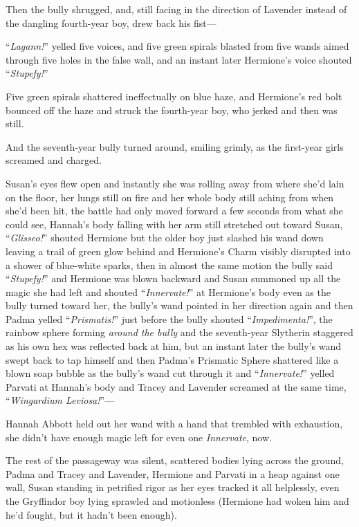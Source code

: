 Then the bully shrugged, and, still facing in the direction of Lavender instead of the dangling fourth-year boy, drew back his fist—

“\emph{Lagann!}” yelled five voices, and five green spirals blasted from five wands aimed through five holes in the false wall, and an instant later Hermione’s voice shouted “\emph{Stupefy!}”

Five green spirals shattered ineffectually on blue haze, and Hermione’s red bolt bounced off the haze and struck the fourth-year boy, who jerked and then was still.

And the seventh-year bully turned around, smiling grimly, as the first-year girls screamed and charged.

\later

Susan’s eyes flew open and instantly she was rolling away from where she’d lain on the floor, her lungs still on fire and her whole body still aching from when she’d been hit, the battle had only moved forward a few seconds from what she could see, Hannah’s body falling with her arm still stretched out toward Susan, “\emph{Glisseo!}” shouted Hermione but the older boy just slashed his wand down leaving a trail of green glow behind and Hermione’s Charm visibly disrupted into a shower of blue-white sparks, then in almost the same motion the bully said “\emph{Stupefy!}” and Hermione was blown backward and Susan summoned up all the magic she had left and shouted “\emph{Innervate!}” at Hermione’s body even as the bully turned toward her, the bully’s wand pointed in her direction again and then Padma yelled “\emph{Prismatis!}” just before the bully shouted “\emph{Impedimenta!}”, the rainbow sphere forming \emph{around the bully} and the seventh-year Slytherin staggered as his own hex was reflected back at him, but an instant later the bully’s wand swept back to tap himself and then Padma’s Prismatic Sphere shattered like a blown soap bubble as the bully’s wand cut through it and “\emph{Innervate!}” yelled Parvati at Hannah’s body and Tracey and Lavender screamed at the same time, “\emph{Wingardium Leviosa!}”—

\later

Hannah Abbott held out her wand with a hand that trembled with exhaustion, she didn’t have enough magic left for even one \emph{Innervate}, now.

The rest of the passageway was silent, scattered bodies lying across the ground, Padma and Tracey and Lavender, Hermione and Parvati in a heap against one wall, Susan standing in petrified rigor as her eyes tracked it all helplessly, even the Gryffindor boy lying sprawled and motionless (Hermione had woken him and he’d fought, but it hadn’t been enough).


